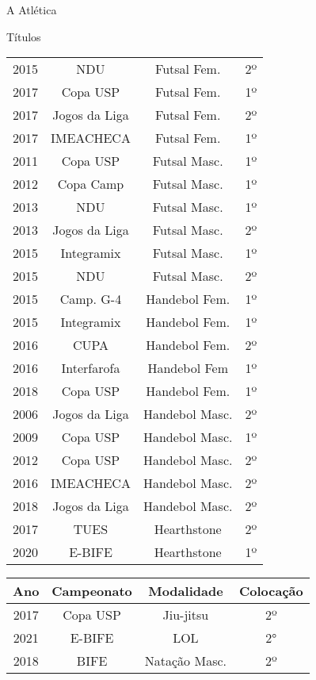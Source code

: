 \begin{secao}{A Atlética}
\begin{subsecao}{Títulos}
\begin{center}
\begin{tabular}{c|c|c|c}
    2015 & NDU            & Futsal Fem.     & 2º\\
    2017 & Copa USP       & Futsal Fem.     & 1º\\
    2017 & Jogos da Liga  & Futsal Fem.     & 2º\\
    2017 & IMEACHECA      & Futsal Fem.     & 1º\\
    2011 & Copa USP       & Futsal Masc.    & 1º\\
    2012 & Copa Camp      & Futsal Masc.    & 1º\\
    2013 & NDU            & Futsal Masc.    & 1º\\
    2013 & Jogos da Liga  & Futsal Masc.    & 2º\\
    2015 & Integramix     & Futsal Masc.    & 1º\\
    2015 & NDU            & Futsal Masc.    & 2º\\
    2015 & Camp. G-4      & Handebol Fem.   & 1º\\
    2015 & Integramix     & Handebol Fem.   & 1º\\
    2016 & CUPA           & Handebol Fem.   & 2º\\
    2016 & Interfarofa    & Handebol Fem    & 1º\\
    2018 & Copa USP       & Handebol Fem.   & 1º\\
    2006 & Jogos da Liga  & Handebol Masc.  & 2º\\
    2009 & Copa USP       & Handebol Masc.  & 1º\\
    2012 & Copa USP       & Handebol Masc.  & 2º\\
    2016 & IMEACHECA      & Handebol Masc.  & 2º\\
    2018 & Jogos da Liga  & Handebol Masc.  & 2º\\
    2017 & TUES           & Hearthstone     & 2º\\
    2020 & E-BIFE         & Hearthstone     & 1º\\
         \end{tabular}
\end{center}
\begin{center}
\begin{tabular}{c|c|c|c}
Ano & Campeonato & Modalidade & Colocação\\
\hline
    2017 & Copa USP       & Jiu-jitsu       & 2º\\
    2021 & E-BIFE         & LOL             & 2°\\
    2018 & BIFE           & Natação Masc.   & 2º\\

\end{tabular}
\end{center}
\end{subsecao}
\end{secao}
